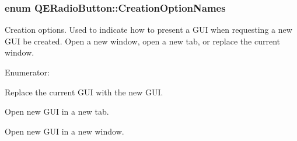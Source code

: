 \hypertarget{classQERadioButton_acb27e9a0a6626e356c5da293352c41c6}{
\subsubsection[{CreationOptionNames}]{\setlength{\rightskip}{0pt plus 5cm}enum {\bf QERadioButton::CreationOptionNames}}}
\label{classQERadioButton_acb27e9a0a6626e356c5da293352c41c6}


Creation options. Used to indicate how to present a GUI when requesting a new GUI be created. Open a new window, open a new tab, or replace the current window. 

\begin{Desc}
\item[Enumerator: ]\par
\begin{description}
\item[{\em 
\hypertarget{classQERadioButton_acb27e9a0a6626e356c5da293352c41c6a20be17f8b2d3e576e1e06f8e26f3de00}{
Open}
\label{classQERadioButton_acb27e9a0a6626e356c5da293352c41c6a20be17f8b2d3e576e1e06f8e26f3de00}
}]Replace the current GUI with the new GUI. \item[{\em 
\hypertarget{classQERadioButton_acb27e9a0a6626e356c5da293352c41c6afa5686675b0bd0fbb273ad162182988a}{
NewTab}
\label{classQERadioButton_acb27e9a0a6626e356c5da293352c41c6afa5686675b0bd0fbb273ad162182988a}
}]Open new GUI in a new tab. \item[{\em 
\hypertarget{classQERadioButton_acb27e9a0a6626e356c5da293352c41c6a39f46039ea158ab5178a8b1e44662df5}{
NewWindow}
\label{classQERadioButton_acb27e9a0a6626e356c5da293352c41c6a39f46039ea158ab5178a8b1e44662df5}
}]Open new GUI in a new window. \end{description}
\end{Desc}

